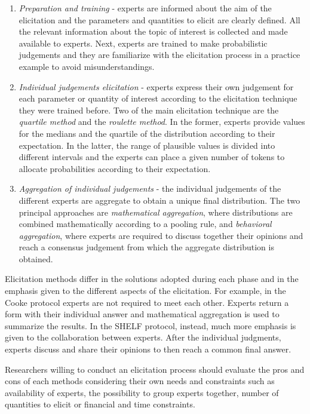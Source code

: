 \documentclass[graybox]{svmult}
\begin{document}
\begin{enumerate}
	\item{\emph{Preparation and training} - experts are informed about  the aim of the elicitation and the parameters and quantities to elicit are clearly defined. All the relevant information about the topic of interest is collected and made available to experts. Next, experts are trained to make probabilistic judgements and they are familiarize with the elicitation process in a practice example to avoid misunderstandings. }
	\item{\emph{Individual judgements elicitation} - experts express their own judgement for each parameter or quantity of interest according to the elicitation technique they were trained before. Two of the main elicitation technique are the \emph{quartile method} and the \emph{roulette method}. In the former, experts provide values for the medians  and the quartile of the distribution according to their expectation. In the latter, the range of plausible values is divided into different intervals and the experts can place a given number of tokens to allocate probabilities according to  their expectation.}
	\item{\emph{Aggregation of individual judgements} - the individual judgements of the different experts are aggregate to obtain a unique final distribution. The two principal approaches are \emph{mathematical  aggregation}, where distributions are combined mathematically according to a pooling rule, and \emph{behavioral aggregation}, where experts are required to discuss together their opinions and reach a consensus judgement from which the aggregate distribution is obtained.}
\end{enumerate}

Elicitation methods differ in the solutions adopted during each phase and in the emphasis given to the different aspects of the elicitation. For example, in the Cooke protocol experts are not required to meet each other. Experts return a form with their individual answer and mathematical aggregation is used to summarize the results. In the SHELF protocol, instead, much more emphasis is given to the collaboration between experts. After the  individual judgments, experts discuss and share their opinions to then reach a common final answer.

Researchers willing to conduct an elicitation process should evaluate the pros and cons of each methods considering their own needs and constraints such as availability of experts, the possibility to group experts together, number of quantities to elicit or financial and time constraints.
\end{document}
